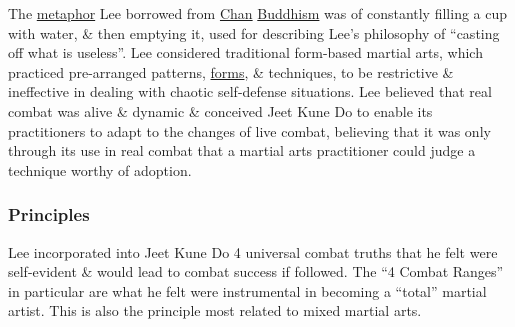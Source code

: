 \documentclass{article}
\begin{document}
The \href{https://en.wikipedia.org/wiki/Metaphor}{metaphor} {\sc Lee} borrowed from \href{https://en.wikipedia.org/wiki/Zen}{Chan} \href{https://en.wikipedia.org/wiki/Buddhism}{Buddhism} was of constantly filling a cup with water, \& then emptying it, used for describing {\sc Lee}'s philosophy of ``casting off what is useless''. {\sc Lee} considered traditional form-based martial arts, which practiced pre-arranged patterns, \href{https://en.wikipedia.org/wiki/Kata}{forms}, \& techniques, to be restrictive \& ineffective in dealing with chaotic self-defense situations. {\sc Lee} believed that real combat was alive \& dynamic \& conceived Jeet Kune Do to enable its practitioners to adapt to the changes of live combat, believing that it was only through its use in real combat that a martial arts practitioner could judge a technique worthy of adoption.

\subsubsection{Principles}
{\sc Lee} incorporated into Jeet Kune Do 4 universal combat truths that he felt were self-evident \& would lead to combat success if followed. The ``4 Combat Ranges'' in particular are what he felt were instrumental in becoming a ``total'' martial artist. This is also the principle most related to mixed martial arts.
\end{document}
